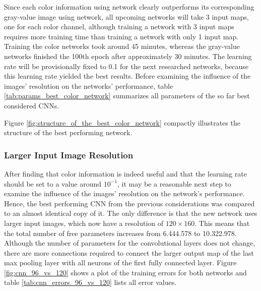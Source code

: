\documentclass[11pt, a4paper]{article}
\begin{document}

Since each color information using network clearly outperforms its corresponding gray-value image using network, all upcoming networks will take 3 input maps, one for each color channel, although training a network with 3 input maps requires more training time than training a network with only 1 input map. Training the color networks took around 45 minutes, whereas the gray-value networks finished the 100th epoch after approximately 30 minutes. The learning rate will be provisionally fixed to 0.1 for the next researched networks, because this learning rate yielded the best results. Before examining the influence of the images' resolution on the networks' performance, table \ref{tab:params_best_color_network} summarizes all parameters of the so far best considered \acp{CNN}.



Figure \ref{fig:structure_of_the_best_color_network} compactly illustrates the structure of the best performing network.



\subsubsection{Larger Input Image Resolution}

After finding that color information is indeed useful and that the learning rate should be set to a value around $10^{-1}$, it may be a reasonable next step to examine the influence of the images' resolution on the network's performance. Hence, the best performing \ac{CNN} from the previous considerations was compared to an almost identical copy of it. The only difference is that the new network uses larger input images, which now have a resolution of $120\times160$. This means that the total number of free parameters increases from 6.444.578 to 10.322.978. Although the number of parameters for the convolutional layers does not change, there are more connections required to connect the larger output map of the last max pooling layer with all neurons of the first fully connected layer. Figure \ref{fig:cnn_96_vs_120} shows a plot of the training errors for both networks and table \ref{tab:cnn_errors_96_vs_120} lists all error values.
\end{document}
